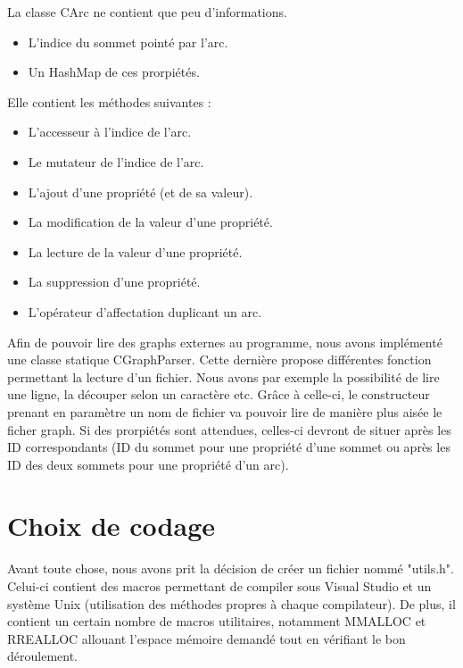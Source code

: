 		La classe CArc ne contient que peu d'informations.
		\begin{itemize}
			\item L'indice du sommet pointé par l'arc.
			\item Un HashMap de ces prorpiétés.\\
		\end{itemize}
		Elle contient les méthodes suivantes :
		\begin{itemize}
			\item L'accesseur à l'indice de l'arc.
			\item Le mutateur de l'indice de l'arc.
			\item L'ajout d'une propriété (et de sa valeur).
			\item La modification de la valeur d'une propriété.
			\item La lecture de la valeur d'une propriété.
			\item La suppression d'une propriété.
			\item L'opérateur d'affectation duplicant un arc.\\
		\end{itemize}
		
		Afin de pouvoir lire des graphs externes au programme, nous avons implémenté une classe statique CGraphParser. Cette dernière propose différentes fonction permettant la lecture d'un fichier. Nous avons par exemple la possibilité de lire une ligne, la découper selon un caractère etc. Grâce à celle-ci, le constructeur prenant en paramètre un nom de fichier va pouvoir lire de manière plus aisée le ficher graph. Si des prorpiétés sont attendues, celles-ci devront de situer après les ID correspondants (ID du sommet pour une propriété d'une sommet ou après les ID des deux sommets pour une propriété d'un arc).
		
		
		
	\chapter{Choix de codage}
		Avant toute chose, nous avons prit la décision de créer un fichier nommé "utils.h". Celui-ci contient des macros permettant de compiler sous Visual Studio et un système Unix (utilisation des méthodes propres à chaque compilateur). De plus, il contient un certain nombre de macros utilitaires, notamment MMALLOC et RREALLOC allouant l'espace mémoire demandé tout en vérifiant le bon déroulement.\\
	
